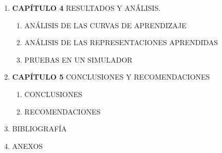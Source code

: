 \begin{enumerate}[nosep, label*=\arabic*.]
    \item \textbf{CAPÍTULO 4} RESULTADOS Y ANÁLISIS.
    \begin{enumerate}[nosep, label*=\arabic*.]
        \item ANÁLISIS DE LAS CURVAS DE APRENDIZAJE
        \item ANÁLISIS DE LAS REPRESENTACIONES APRENDIDAS
        \item PRUEBAS EN UN SIMULADOR
    \end{enumerate}
    \item \textbf{CAPÍTULO 5} CONCLUSIONES Y RECOMENDACIONES
    \begin{enumerate}[nosep, label*=\arabic*.]
        \item CONCLUSIONES
        \item RECOMENDACIONES
    \end{enumerate}
    \item BIBLIOGRAFÍA
    \item ANEXOS
\end{enumerate}